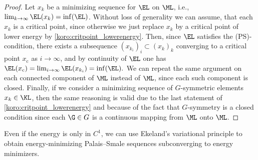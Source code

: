 \begin{proof}
Let $x_k$ be a minimizing sequence for $\EL$ on $\ML$, i.e.,
$\lim_{k\to\infty}\EL(x_k)=\inf(\EL)$. 
Without loss of generality we can assume, that each $x_k$ is a critical point, since otherwise we just replace $x_k$ 
by a critical point of lower energy by \cref{koro:critpoint_lowerenergy}. Then, since $\EL$ satisfies the (PS)-condition, 
there exists a subsequence $(x_{k_i})_i\subset (x_k)_k$ 
converging to a critical point 
$x_{\text{c}}$ as $i\to\infty$, and by continuity of $\EL$ one has
$
\EL(x_{\text{c}})=\lim_{i\to\infty}\EL(x_{k_i})=\inf(\EL).
$
We can repeat the same argument on each connected component of $\ML$ instead
of $\ML$, since each such component is closed.
Finally, if we consider a minimizing sequence of $G$-symmetric
elements $x_k\in\KL$, then the same reasoning is valid due to the last
statement of \cref{koro:critpoint_lowerenergy} and because of the fact
that $G$-symmetry is a closed condition since each $\G\in G$ is a
continuous mapping from $\ML$ onto $\ML$.
\end{proof}


Even if the energy is only in $C^1$, we can use Ekeland's variational
principle to obtain energy-minimizing
Palais--Smale sequences subconverging to
energy minimizers. 

